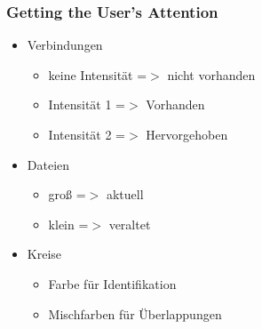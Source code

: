 \begin{frame}

\frametitle{Getting the User's Attention}
\label{gettingtheusersattention}

\begin{itemize}
\item Verbindungen

\begin{itemize}
\item keine Intensität =$>$ nicht vorhanden

\item Intensität 1 =$>$ Vorhanden

\item Intensität 2 =$>$ Hervorgehoben

\end{itemize}

\item Dateien

\begin{itemize}
\item groß =$>$ aktuell

\item klein =$>$ veraltet

\end{itemize}

\item Kreise

\begin{itemize}
\item Farbe für Identifikation

\item Mischfarben für Überlappungen

\end{itemize}

\end{itemize}

\end{frame}

